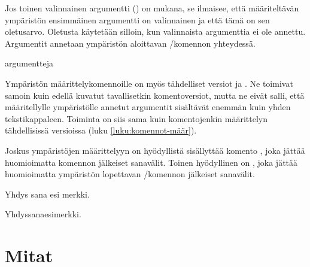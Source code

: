 Jos toinen valinnainen argumentti () on mukana, se
ilmaisee, että määriteltävän ympäristön ensimmäinen argumentti on
valinnainen ja että tämä on sen ole\-tus\-arvo. Oletusta käytetään
silloin, kun valinnaista argumenttia ei ole annettu. Argumentit annetaan
ympäristön aloittavan \-/komennon yhteydessä.

\begin{koodilohkosis}
  \begin{ymp}[valinnainen]{argu}{mentteja}
  \end{ymp}
\end{koodilohkosis}

Ympäristön määrittelykomennoille on myös tähdelliset versiot
 ja . Ne
toimivat samoin kuin edellä kuvatut tavallisetkin komentoversiot, mutta
ne eivät salli, että määritellylle ympäristölle annetut argumentit
sisältävät enemmän kuin yhden tekstikappaleen. Toiminta on siis sama
kuin komentojenkin määrittelyn tähdellisissä versioissa (luku
\ref{luku:komennot-määr}).

\begin{koodilohkosis}
  \newenvironment*   {nimi}[n][oletus]{aloitus}{lopetus}
  \renewenvironment* {nimi}[n][oletus]{aloitus}{lopetus}
\end{koodilohkosis}

Joskus ympäristöjen määrittelyyn on hyödyllistä sisällyttää komento
, joka jättää huomioimatta komennon jälkeiset
sanavälit. Toinen hyödyllinen on , joka jättää huomioimatta ympäristön
lopettavan \-/komennon jälkeiset sanavälit.

\pagebreak[3]

\begin{koodilohkosis}
  \newenvironment{ymp}
    {Yhdys\ignorespaces}
    {esi\ignorespacesafterend}

  \begin{ymp}
    sana%
  \end{ymp}   merkki.
\end{koodilohkosis}

\begin{tulossis}
  Yhdyssanaesimerkki.
\end{tulossis}

\section{Mitat}
\label{luku:mitat}

